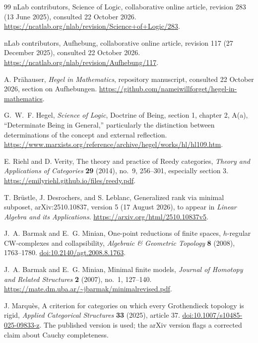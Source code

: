 \begin{thebibliography}{99}
nLab contributors, Science of Logic, collaborative online article,
revision 283 (13 June 2025), consulted 22 October 2026.
\url{https://ncatlab.org/nlab/revision/Science+of+Logic/283}.

nLab contributors, Aufhebung, collaborative online article,
revision 117 (27 December 2025), consulted 22 October 2026.
\url{https://ncatlab.org/nlab/revision/Aufhebung/117}.

A. Pr\"ahauser, \emph{Hegel in Mathematics}, repository manuscript,
consulted 22 October 2026, section on Aufhebungen.
\url{https://github.com/nameiwillforget/hegel-in-mathematics}.

G.~W.~F. Hegel, \emph{Science of Logic}, Doctrine of Being, section 1,
chapter 2, A(a), ``Determinate Being in General,'' particularly the
distinction between determinations of the concept and external reflection.
\url{https://www.marxists.org/reference/archive/hegel/works/hl/hl109.htm}.

E. Riehl and D. Verity, The theory and practice of Reedy categories,
\emph{Theory and Applications of Categories} \textbf{29} (2014),
no.~9, 256--301, especially section 3.
\url{https://emilyriehl.github.io/files/reedy.pdf}.

T. Br\"ustle, J. Desrochers, and S. Leblanc, Generalized rank via
minimal subposet, arXiv:2510.10837, version 5 (17 August 2026),
to appear in \emph{Linear Algebra and its Applications}.
\url{https://arxiv.org/html/2510.10837v5}.

J.~A. Barmak and E.~G. Minian, One-point reductions of finite spaces,
$h$-regular CW-complexes and collapsibility,
\emph{Algebraic \& Geometric Topology} \textbf{8} (2008), 1763--1780.
\href{https://doi.org/10.2140/agt.2008.8.1763}{doi:10.2140/agt.2008.8.1763}.

J.~A. Barmak and E.~G. Minian, Minimal finite models,
\emph{Journal of Homotopy and Related Structures} \textbf{2}
(2007), no.~1, 127--140.
\url{https://mate.dm.uba.ar/~jbarmak/minimalrevised.pdf}.

J. Marqu\`es, A criterion for categories on which every Grothendieck
topology is rigid, \emph{Applied Categorical Structures} \textbf{33}
(2025), article 37.
\href{https://doi.org/10.1007/s10485-025-09833-z}{doi:10.1007/s10485-025-09833-z}.
The published version is used; the arXiv version flags a corrected claim
about Cauchy completeness.


\end{thebibliography}

